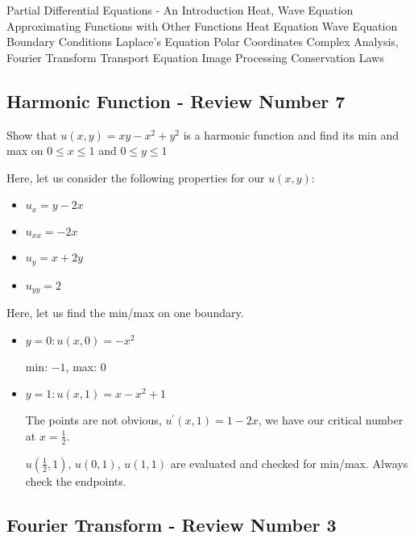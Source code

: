 \documentclass{article}
\begin{document}
\maketitle

\newpage

\tableofcontents
%
\newpage
%
{Partial Differential Equations - An Introduction}
{Heat, Wave Equation}
{Approximating Functions with Other Functions}
{Heat Equation}
{Wave Equation}
{Boundary Conditions}
{Laplace's Equation}
{Polar Coordinates}
{Complex Analysis, Fourier Transform}
{Transport Equation}
{Image Processing}
{Conservation Laws}

\subsection*{Harmonic Function - Review Number 7}

Show that $u(x, y) = xy - x^2 + y^2$ is a harmonic function and find its min and max on $0 \leq x \leq 1$ and $0 \leq y \leq 1$

Here, let us consider the following properties for our $u(x, y)$:
%
\begin{itemize}
  \item $u_x = y - 2x$
  \item $u_{xx} = -2x$
  \item $u_y = x + 2y$
  \item $u_{yy} = 2$
\end{itemize}

Here, let us find the min/max on one boundary.
\begin{itemize}
  \item $y = 0 : u(x, 0) = -x^2$

  min: $-1$, max: $0$
  \item $y = 1 : u(x, 1) = x - x^2 + 1$

  The points are not obvious, $u^\prime(x, 1) = 1 - 2x$, we have our critical number at $x = \frac{1}{2}$.

  $u(\frac{1}{2}, 1)$, $u(0, 1)$, $u(1, 1)$ are evaluated and checked for min/max. Always check the endpoints.
\end{itemize}

\subsection*{Fourier Transform - Review Number 3}
\end{document}
